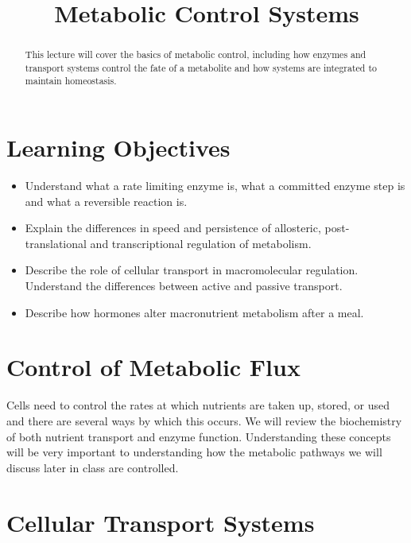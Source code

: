 \documentclass{tufte-handout}
\title{Metabolic Control Systems}
\author{}
\date{}  %
\begin{document}
\maketitle%

\begin{abstract}
\noindent This lecture will cover the basics of metabolic control, including how enzymes and transport systems control the fate of a metabolite and how systems are integrated to maintain homeostasis.
\end{abstract}

\tableofcontents

\pagebreak
\section{Learning Objectives}

\begin{itemize}
\item Understand what a rate limiting enzyme is, what a committed enzyme step is and what a reversible reaction is.
\item Explain the differences in speed and persistence of allosteric, post-translational and transcriptional regulation of metabolism.
\item Describe the role of cellular transport in macromolecular regulation. Understand the differences between active and passive transport.
\item Describe how hormones alter macronutrient metabolism after a meal.

\end{itemize}

\pagebreak

\section{Control of Metabolic Flux}

Cells need to control the rates at which nutrients are taken up, stored, or used and there are several ways by which this occurs.  We will review the biochemistry of both nutrient transport and enzyme function.  Understanding these concepts will be very important to understanding how the metabolic pathways we will discuss later in class are controlled. 

\section{Cellular Transport Systems}
\end{document}
